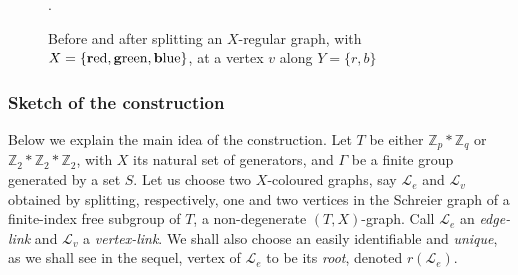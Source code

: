 \documentclass[ALCO,ThmDefs,Unicode,epreuves]{cedram}
\newcommand{\ZZ}{\mathbb{Z}}
\newcommand{\cL}{\mathcal{L}}
\begin{document}
 \begin{figure}[htb]
 \centering
 \qquad
 \caption{Before and after splitting an $X$-regular graph, with $X = \{\text{\textbf{r}ed}, \text{\textbf{g}reen}, \text{\textbf{b}lue}\}$, at a vertex $v$ along $Y = \{r,b\}$}.
 \label{fig:vertex-splitting}
 \end{figure}
 
\subsubsection{Sketch of the construction}
Below we explain the main idea of the construction. Let $T$ be either $\ZZ_p*\ZZ_q$ or $\ZZ_2*\ZZ_2*\ZZ_2$, with $X$ its natural set of generators, and ${\Gamma}$ be a finite group generated by a set $S$. Let us choose two $X$-coloured graphs, say $\cL_e$ and $\cL_v$ obtained by splitting, respectively, one and two vertices in the Schreier graph of a finite-index free subgroup of $T$, \ie a non-degenerate $(T,X)$-graph. Call $\cL_e$ an \emph{edge-link} and $\cL_v$ a \emph{vertex-link}. We shall also choose an easily identifiable and \emph{unique}, as we shall see in the sequel, vertex of $\cL_e$ to be its \emph{root}, denoted $r(\cL_e)$.
\end{document}
